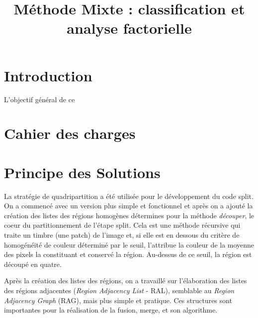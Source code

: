 \documentclass{rapportECL}
\title{Méthode Mixte : classification et analyse factorielle} %
\begin{document}




        
\fairemarges %
\fairepagedegarde %
\tabledematieres %



\section{Introduction} 

L'objectif général de ce 

\section{Cahier des charges}

\section{Principe des Solutions}

La stratégie de quadripartition a été utilisée pour le développement du code split. On a commencé avec un version plus simple et fonctionnel et après on a ajouté la création des listes des régions homogènes détermines pour la méthode \textit{découper}, le coeur du partitionnement de l'étape split. Cela est une méthode récursive qui traite un timbre (une patch) de l'image et, si elle est en dessous du critère de homogénéité de couleur déterminé par le seuil, l'attribue la couleur de la moyenne des pixels la constituant et conservé la région. Au-dessus de ce seuil, la région est découpé en quatre.

Après la création des listes des régions, on a travaillé sur l'élaboration des listes des régions adjacentes (\textit{Region Adjacency List} - RAL), semblable au \textit{Region Adjacency Graph} (RAG), mais plus simple et pratique. Ces structures sont importantes pour la réalisation de la fusion, merge, et son algorithme.
\end{document}
